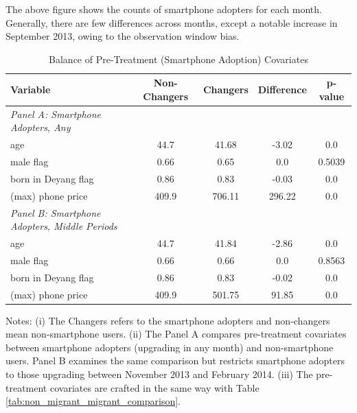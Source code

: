 The above figure shows the counts of smartphone adopters for each month. Generally, there are few differences across months, except a notable increase in September 2013, owing to the observation window bias.

\begin{table}[htbp]
\vspace{0.5cm}
\renewcommand{\arraystretch}{1.6}
\setlength{\tabcolsep}{1.1mm}{}
\centering
\small
\caption{Balance of Pre-Treatment (Smartphone Adoption) Covariates}
\begin{tabular}{lcccc} \hline
Variable & Non-Changers & Changers & Difference & p-value \\ \hline
\textit{Panel A: Smartphone Adopters, Any} \\
age & 44.7 & 41.68 & -3.02 & 0.0 \\
male flag & 0.66 & 0.65 & 0.0 & 0.5039 \\
born in Deyang flag & 0.86 & 0.83 & -0.03 & 0.0 \\
(max) phone price & 409.9 & 706.11 & 296.22 & 0.0 \\ \hline

\textit{Panel B: Smartphone Adopters, Middle Periods} \\
age & 44.7 & 41.84 & -2.86 & 0.0 \\
male flag & 0.66 & 0.66 & 0.0 & 0.8563 \\
born in Deyang flag & 0.86 & 0.83 & -0.02 & 0.0 \\
(max) phone price & 409.9 & 501.75 & 91.85 & 0.0 \\ \hline

\end{tabular}
\label{tab:non_changer_changer_comparison}%
\end{table}%

\vspace{-2em}
\begin{singlespace}
\begin{footnotesize}
\noindent Notes: (i) The Changers refers to the smartphone adopters and non-changers mean non-smartphone users. (ii) The Panel A compares pre-treatment covariates between smartphone adopters (upgrading in any month) and non-smartphone users. Panel B examines the same comparison but restricts smartphone adopters to those upgrading between November 2013 and February 2014. (iii) The pre-treatment covariates are crafted in the same way with Table \ref{tab:non_migrant_migrant_comparison}.
\end{footnotesize}
\end{singlespace}


